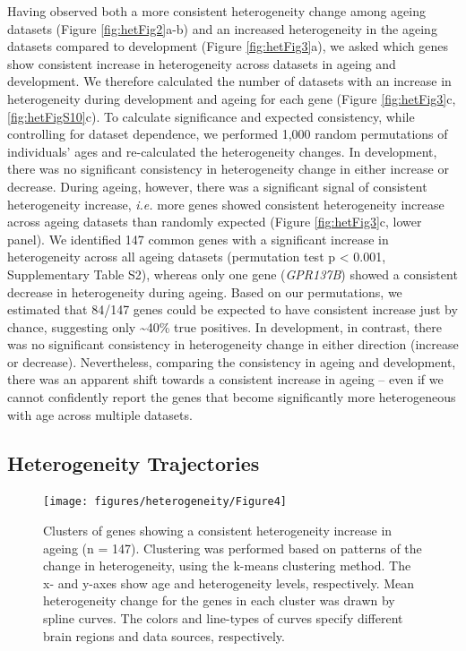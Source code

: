 \documentclass[12pt,twoside]{unicam}
\begin{document}
Having observed both a more consistent heterogeneity change among ageing datasets (Figure \ref{fig:hetFig2}a-b) and an increased heterogeneity in the ageing datasets compared to development (Figure \ref{fig:hetFig3}a), we asked which genes show consistent increase in heterogeneity across datasets in ageing and development. We therefore calculated the number of datasets with an increase in heterogeneity during development and ageing for each gene (Figure \ref{fig:hetFig3}c, \ref{fig:hetFigS10}c). To calculate significance and expected consistency, while controlling for dataset dependence, we performed 1,000 random permutations of individuals' ages and re-calculated the heterogeneity changes. In development, there was no significant consistency in heterogeneity change in either increase or decrease. During ageing, however, there was a significant signal of consistent heterogeneity increase, \emph{i.e.} more genes showed consistent heterogeneity increase across ageing datasets than randomly expected (Figure \ref{fig:hetFig3}c, lower panel). We identified 147 common genes with a significant increase in heterogeneity across all ageing datasets (permutation test p \textless{} 0.001, Supplementary Table S2), whereas only one gene (\emph{GPR137B}) showed a consistent decrease in heterogeneity during ageing. Based on our permutations, we estimated that 84/147 genes could be expected to have consistent increase just by chance, suggesting only \textasciitilde40\% true positives. In development, in contrast, there was no significant consistency in heterogeneity change in either direction (increase or decrease). Nevertheless, comparing the consistency in ageing and development, there was an apparent shift towards a consistent increase in ageing -- even if we cannot confidently report the genes that become significantly more heterogeneous with age across multiple datasets.

\hypertarget{heterogeneity-trajectories}{%
\subsection{Heterogeneity Trajectories}\label{heterogeneity-trajectories}}

\begin{figure}

{\centering \texttt{[image: figures/heterogeneity/Figure4]} 

}

\caption[Clusters of genes showing a consistent heterogeneity increase in ageing]{Clusters of genes showing a consistent heterogeneity increase in ageing (n = 147). Clustering was performed based on patterns of the change in heterogeneity, using the k-means clustering method. The x- and y-axes show age and heterogeneity levels, respectively. Mean heterogeneity change for the genes in each cluster was drawn by spline curves. The colors and line-types of curves specify different brain regions and data sources, respectively.}\label{fig:hetFig4}
\end{figure}
\end{document}

